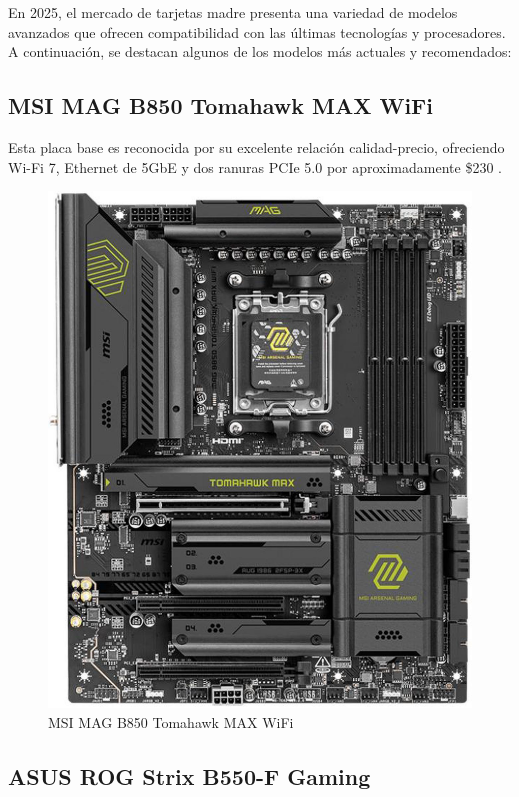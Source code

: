 En 2025, el mercado de tarjetas madre presenta una variedad de modelos avanzados que ofrecen compatibilidad con las últimas tecnologías y procesadores. A continuación, se destacan algunos de los modelos más actuales y recomendados:

\subsection{MSI MAG B850 Tomahawk MAX WiFi}

Esta placa base es reconocida por su excelente relación calidad-precio, ofreciendo Wi-Fi 7, Ethernet de 5GbE y dos ranuras PCIe 5.0 por aproximadamente \$230 \cite{tomshardware2025}.

\begin{figure}
  \centering
  \includegraphics[scale=0.1]{imagenes/tomahawk.png}
  \caption{MSI MAG B850 Tomahawk MAX WiFi}
\end{figure}

\subsection{ASUS ROG Strix B550-F Gaming}

